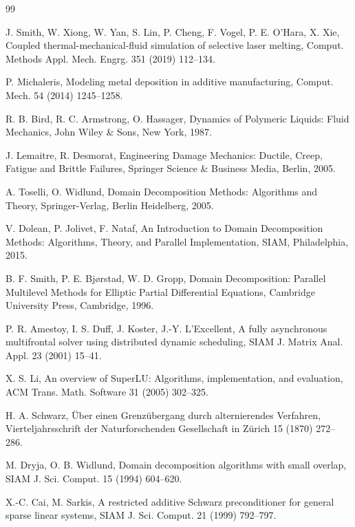 \documentclass[preprint,12pt,3p]{elsarticle}
\begin{document}
\begin{thebibliography}{99}

J. Smith, W. Xiong, W. Yan, S. Lin, P. Cheng, F. Vogel, P. E. O’Hara, X. Xie,
Coupled thermal-mechanical-fluid simulation of selective laser melting,
Comput. Methods Appl. Mech. Engrg. 351 (2019) 112--134.

P. Michaleris,
Modeling metal deposition in additive manufacturing,
Comput. Mech. 54 (2014) 1245--1258.

R. B. Bird, R. C. Armstrong, O. Hassager,
Dynamics of Polymeric Liquids: Fluid Mechanics,
John Wiley \& Sons, New York, 1987.

J. Lemaitre, R. Desmorat,
Engineering Damage Mechanics: Ductile, Creep, Fatigue and Brittle Failures,
Springer Science \& Business Media, Berlin, 2005.

A. Toselli, O. Widlund,
Domain Decomposition Methods: Algorithms and Theory,
Springer-Verlag, Berlin Heidelberg, 2005.

V. Dolean, P. Jolivet, F. Nataf,
An Introduction to Domain Decomposition Methods: Algorithms, Theory, and Parallel Implementation,
SIAM, Philadelphia, 2015.

B. F. Smith, P. E. Bj{\o}rstad, W. D. Gropp,
Domain Decomposition: Parallel Multilevel Methods for Elliptic Partial Differential Equations,
Cambridge University Press, Cambridge, 1996.

P. R. Amestoy, I. S. Duff, J. Koster, J.-Y. L'Excellent,
A fully asynchronous multifrontal solver using distributed dynamic scheduling,
SIAM J. Matrix Anal. Appl. 23 (2001) 15--41.

X. S. Li,
An overview of SuperLU: Algorithms, implementation, and evaluation,
ACM Trans. Math. Software 31 (2005) 302--325.

H. A. Schwarz,
{\"U}ber einen Grenzübergang durch alternierendes Verfahren,
Vierteljahrsschrift der Naturforschenden Gesellschaft in Z{\"u}rich 15 (1870) 272--286.

M. Dryja, O. B. Widlund,
Domain decomposition algorithms with small overlap,
SIAM J. Sci. Comput. 15 (1994) 604--620.

X.-C. Cai, M. Sarkis,
A restricted additive Schwarz preconditioner for general sparse linear systems,
SIAM J. Sci. Comput. 21 (1999) 792--797.


\end{thebibliography}
\end{document}
